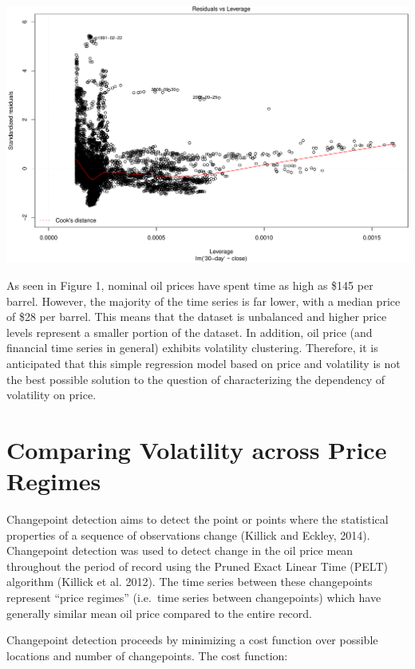\documentclass[11pt,]{article}
\makeatletter
\def\maxwidth{\ifdim\Gin@nat@width>\linewidth\linewidth
\else\Gin@nat@width\fi}
\let\Oldincludegraphics\includegraphics
\renewcommand{\includegraphics}[1]{\Oldincludegraphics[width=\maxwidth]{#1}}
\makeatother
\begin{document}
\includegraphics{Figs/unnamed-chunk-10-4.pdf}

As seen in Figure 1, nominal oil prices have spent time as high as \$145
per barrel. However, the majority of the time series is far lower, with
a median price of \$28 per barrel. This means that the dataset is
unbalanced and higher price levels represent a smaller portion of the
dataset. In addition, oil price (and financial time series in general)
exhibits volatility clustering. Therefore, it is anticipated that this
simple regression model based on price and volatility is not the best
possible solution to the question of characterizing the dependency of
volatility on price.

\section{Comparing Volatility across Price
Regimes}\label{comparing-volatility-across-price-regimes}

Changepoint detection aims to detect the point or points where the
statistical properties of a sequence of observations change (Killick and
Eckley, 2014). Changepoint detection was used to detect change in the
oil price mean throughout the period of record using the Pruned Exact
Linear Time (PELT) algorithm (Killick et al. 2012). The time series
between these changepoints represent ``price regimes'' (i.e.~time series
between changepoints) which have generally similar mean oil price
compared to the entire record.

Changepoint detection proceeds by minimizing a cost function over
possible locations and number of changepoints. The cost function:
\end{document}
